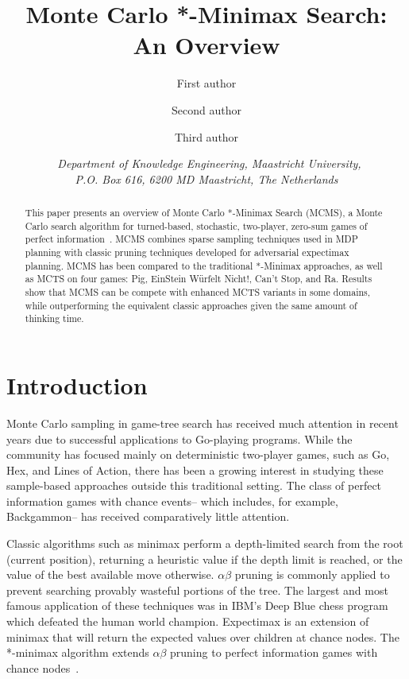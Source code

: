 \documentclass{article}
\title{\textbf{\huge Monte Carlo *-Minimax Search: An Overview}}
\author{First author \affila \and
    Second author \affila \and
    Third author \affila}
\date{\affila\ \textit{Department of Knowledge Engineering, Maastricht University,\\ P.O. Box 616, 6200 MD Maastricht, The Netherlands}}
\begin{document}
\ttl
\thispagestyle{empty}



\begin{abstract}
\noindent   This paper presents an overview of Monte Carlo *-Minimax Search (MCMS), a Monte Carlo search algorithm for 
  turned-based, stochastic, two-player, zero-sum games of perfect information~\cite{Lanctot13MCMS}.
  MCMS combines sparse sampling techniques used in MDP planning with classic pruning techniques developed 
  for adversarial expectimax planning.
  MCMS has been compared to the traditional *-Minimax approaches, as well as MCTS  
  on four games: Pig, EinStein W\"{u}rfelt Nicht!, Can't Stop, and Ra.
  Results show that MCMS can be compete with enhanced MCTS variants in some domains, 
  while outperforming the equivalent classic approaches given the same amount of thinking time. 
\end{abstract}

\section{Introduction}

Monte Carlo sampling in game-tree search has received much attention in recent years due to successful applications to 
Go-playing programs. 
While the community has focused mainly on deterministic two-player games, such as Go, Hex, and Lines of Action, there
has been a growing interest in studying these sample-based approaches outside this traditional setting. The class of 
perfect information games with chance events-- which includes, for example, Backgammon-- has received comparatively 
little attention. 

Classic algorithms such as minimax perform a depth-limited search from the root (current position), 
returning a heuristic value if the depth limit is reached, or the value of the best available move otherwise.  
$\alpha \beta$ pruning is commonly applied to prevent searching provably wasteful portions of the tree. The largest 
and most famous application of these techniques was in IBM's Deep Blue chess program which defeated the human world 
champion. Expectimax is an extension of minimax that will return the expected values over children at 
chance nodes. The *-minimax algorithm extends $\alpha \beta$ pruning to perfect information games with 
chance nodes~\cite{Ballard83}. 
\end{document}
